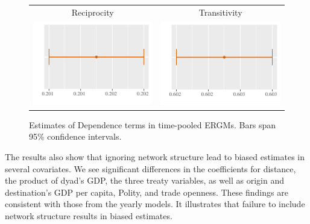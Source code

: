 \documentclass[reqno,onecolumn,letterpaper,12pt]{article}
\begin{document}
\begin{figure}[!h]
\centering
\begin{tabular}{c@{\hskip 0cm}c}
Reciprocity & Transitivity \\
\includegraphics[height=.2\textheight, clip=true, trim=0cm 0cm 0cm .2cm]{draft_figures/plots_pooled/Mutuality.pdf}    &
\includegraphics[height=.2\textheight, clip=true, trim=0cm 0cm 0cm .2cm]{draft_figures/plots_pooled/Transitivity.pdf}
\end{tabular}
\caption{\label{fig:exog_2} Estimates of Dependence terms in time-pooled ERGMs. Bars span 95\% confidence intervals. }
\end{figure}


The results also show that ignoring network structure lead to biased estimates in several covariates. We see significant differences in the coefficients for distance, the product of dyad's GDP, the three treaty variables, as well as origin and destination's GDP per capita, Polity, and trade openness. These findings are consistent with those from the yearly models. It illustrates that failure to include network structure results in biased estimates.
\end{document}
